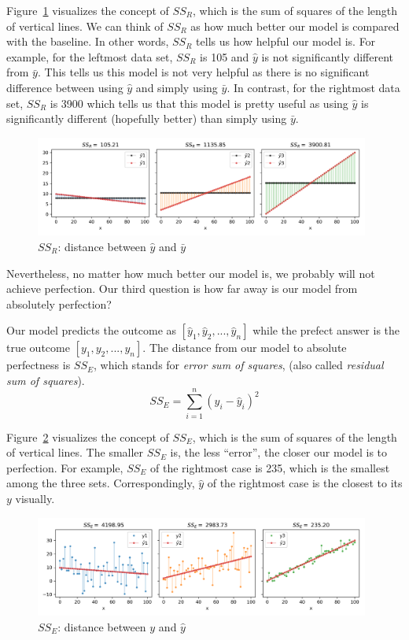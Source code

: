 \documentclass[
	letterpaper
]{article}
\begin{document}
Figure~\ref{fig:ssr} visualizes the concept of $SS_R$, which is the sum of squares of the length of vertical lines.
We can think of $SS_R$ as how much better our model is compared with the baseline.
In other words, $SS_R$ tells us how helpful our model is.
For example, for the leftmost data set, $SS_R$ is 105 and $\hat y$ is not significantly different from $\bar y$.
This tells us this model is not very helpful as there is no significant difference between using $\hat y$ and simply using $\bar y$.
In contrast, for the rightmost data set, $SS_R$ is 3900 which tells us that this model is pretty useful as using $\hat y$ is significantly different (hopefully better) than simply using $\bar y$.
\begin{figure}[htbp]
	\centering
	\includegraphics[width=0.98\textwidth]{figures/comparison-ssr.png}
	\caption{$SS_R$: distance between $\hat y$ and $\bar y$}
	\label{fig:ssr}
\end{figure}

Nevertheless, no matter how much better our model is, we probably will not achieve perfection. 
Our third question is how far away is our model from absolutely perfection?

Our model predicts the outcome as $[\hat y_1, \hat y_2, ..., \hat y_n]$ while the prefect answer is the true outcome $[y_1, y_2, ..., y_n]$.
The distance from our model to absolute perfectness is $SS_E$, which stands for \textit{error sum of squares}, (also called \textit{residual sum of squares}). 
\begin{equation}
SS_E = \sum_{i = 1}^n (y_i - \hat y_i) ^2 
\end{equation}

Figure~\ref{fig:sse} visualizes the concept of $SS_E$, which is the sum of squares of the length of vertical lines.
The smaller $SS_E$ is, the less ``error'', the closer our model is to perfection.
For example, $SS_E$ of the rightmost case is 235, which is the smallest among the three sets.
Correspondingly, $\hat y$ of the rightmost case is the  closest to its $y$ visually.
\begin{figure}[htbp]
	\centering
	\includegraphics[width=0.98\textwidth]{figures/comparison-sse.png}
	\caption{$SS_E$: distance between $y$ and $\hat y$}
	\label{fig:sse}
\end{figure}
\end{document}
